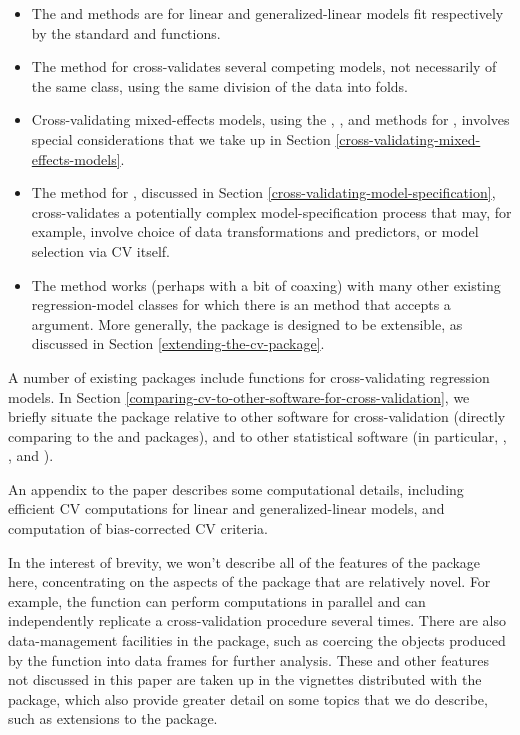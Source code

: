 \documentclass[
]{jss}
\begin{document}
\begin{itemize}
\item
  The  and  methods are for linear and
  generalized-linear models fit respectively by the standard
    and  functions.
\item
  The  method for  cross-validates several
  competing models, not necessarily of the same class, using the same
  division of the data into folds.
\item
  Cross-validating mixed-effects models, using the ,
  , and  methods for , involves
  special considerations that we take up in Section
  \ref{cross-validating-mixed-effects-models}.
\item
  The  method for , discussed in Section
  \ref{cross-validating-model-specification}, cross-validates a
  potentially complex model-specification process that may, for example,
  involve choice of data transformations and predictors, or model
  selection via CV itself.
\item
  The   method works (perhaps with a bit of
  coaxing) with many other existing regression-model classes for which
  there is an  method that accepts a 
  argument. More generally, the  package is designed to be
  extensible, as discussed in Section \ref{extending-the-cv-package}.
\end{itemize}

A number of existing  packages include functions for
cross-validating regression models. In Section
\ref{comparing-cv-to-other-software-for-cross-validation}, we briefly
situate the  package relative to other  software for
cross-validation (directly comparing  to the  and
 packages), and to other statistical software (in particular,
, , and ).

An appendix to the paper describes some computational details, including
efficient CV computations for linear and generalized-linear models, and
computation of bias-corrected CV criteria.

In the interest of brevity, we won't describe all of the features of the
 package here, concentrating on the aspects of the package that
are relatively novel. For example, the  function can perform
computations in parallel and can independently replicate a
cross-validation procedure several times. There are also data-management
facilities in the package, such as coercing the objects produced by the
 function into data frames for further analysis. These and
other features not discussed in this paper are taken up in the vignettes
distributed with the package, which also provide greater detail on some
topics that we do describe, such as extensions to the package.
\end{document}
